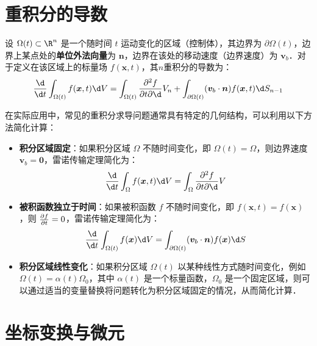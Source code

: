 \documentclass[12pt, a4paper, oneside, UTF8]{ctexbook}
\begin{document}
\section{重积分的导数}
\begin{theorem}
    设 $\Omega(t)\subset \R^n$ 是一个随时间 $t$ 运动变化的区域（控制体），其边界为 $\partial\Omega(t)$，边界上某点处的\textbf{单位外法向量}为 $\bm{n}$，边界在该处的移动速度（边界速度）为 $\bm{v}_b$．对于定义在该区域上的标量场 $f(\bm{x}, t)$，其$n$重积分的导数为：
    \[ \frac{\d}{\d t} \int_{\Omega(t)} f(\bm{x}, t) \d V = \int_{\Omega(t)} \pdv{f}{t} \d V_n + \int_{\partial\Omega(t)} (\bm{v}_b \cdot \bm{n})f(\bm{x}, t)  \d S_{n-1} \]
\end{theorem}
\begin{corollary}[重积分求导的特殊情况]
    在实际应用中，常见的重积分求导问题通常具有特定的几何结构，可以利用以下方法简化计算：
    \begin{itemize}
        \item \textbf{积分区域固定}：如果积分区域 $\Omega$ 不随时间变化，即 $\Omega(t) = \Omega$，则边界速度 $\bm{v}_b = \bm{0}$，雷诺传输定理简化为：
        \[ \frac{\d}{\d t} \int_{\Omega} f(\bm{x}, t) \d V = \int_{\Omega} \pdv{f}{t} \d V \]
        \item \textbf{被积函数独立于时间}：如果被积函数 $f$ 不随时间变化，即 $f(\bm{x}, t) = f(\bm{x})$，则 $\pdv{f}{t} = 0$，雷诺传输定理简化为：
        \[ \frac{\d}{\d t} \int_{\Omega(t)} f(\bm{x}) \d V = \int_{\partial\Omega(t)} (\bm{v}_b \cdot \bm{n})f(\bm{x})  \d S \]
        \item \textbf{积分区域线性变化}：如果积分区域 $\Omega(t)$ 以某种线性方式随时间变化，例如 $\Omega(t) = \alpha(t)\Omega_0$，其中 $\alpha(t)$ 是一个标量函数，$\Omega_0$ 是一个固定区域，则可以通过适当的变量替换将问题转化为积分区域固定的情况，从而简化计算．
    \end{itemize}
    
\end{corollary}

\section{坐标变换与微元}
\end{document}
